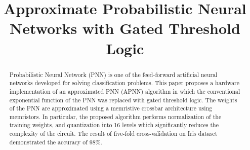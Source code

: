 \documentclass[sigconf]{acmart}
\begin{document}
\title{Approximate Probabilistic Neural Networks with Gated Threshold Logic}




\begin{abstract}
Probabilistic Neural Network (PNN) is one of the feed-forward artificial neural networks developed for solving classification problems. This paper proposes a hardware implementation of an approximated PNN (APNN) algorithm in which the conventional exponential function of the PNN was replaced with gated threshold logic. The weights of the PNN are approximated using a memristive crossbar architecture using memristors. In particular, the proposed algorithm performs normalization of the training weights, and quantization into 16 levels which significantly reduces the complexity of the circuit. The result of five-fold cross-validation on Iris dataset demonstrated the accuracy of 98\%.
\end{abstract}

%
%
\begin{CCSXML}
 
\end{CCSXML}






\maketitle
\end{document}
